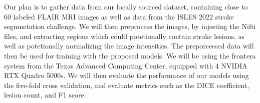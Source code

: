 \par Our plan is to gather data from our locally sourced dataset, containing close to 60
labeled FLAIR MRI images as well as data from the ISLES 2022 stroke segmnetation challenge. 
We will then preprocess the images, by injesting the Nifti files, and extracting
regions which could potetionally contain stroke lesions, as well as potetionally 
normalizing the image intensities. The preporcessed data will then be used
for training with the proposed models. We will be using the frontera system from
the Texas Advanced Computing Center, equipped with 4 NVIDIA RTX Quadro 5000s.
We will then evaluate the performance of our models using the five-fold cross validation, 
and evaluate metrics such as the DICE coefficient, lesion count, and F1 score.
